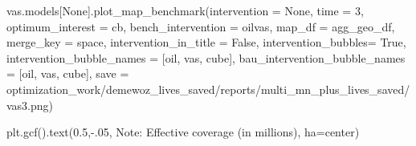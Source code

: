 \documentclass[
]{article}
\newenvironment{Shaded}{}{}
\newcommand{\DecValTok}[1]{\textcolor[rgb]{0.25,0.63,0.44}{#1}}
\newcommand{\FloatTok}[1]{\textcolor[rgb]{0.25,0.63,0.44}{#1}}
\newcommand{\NormalTok}[1]{#1}
\newcommand{\OperatorTok}[1]{\textcolor[rgb]{0.40,0.40,0.40}{#1}}
\newcommand{\StringTok}[1]{\textcolor[rgb]{0.25,0.44,0.63}{#1}}
\newcommand{\VariableTok}[1]{\textcolor[rgb]{0.10,0.09,0.49}{#1}}
\begin{document}
\begin{Shaded}
\begin{Highlighting}[numbers=left,,firstnumber=152,]
\NormalTok{vas.models[}\VariableTok{None}\NormalTok{].plot\_map\_benchmark(intervention }\OperatorTok{=} \VariableTok{None}\NormalTok{, }
\NormalTok{time }\OperatorTok{=} \DecValTok{3}\NormalTok{, }
\NormalTok{optimum\_interest }\OperatorTok{=} \StringTok{\textquotesingle{}cb\textquotesingle{}}\NormalTok{, }
\NormalTok{bench\_intervention }\OperatorTok{=} \StringTok{\textquotesingle{}oilvas\textquotesingle{}}\NormalTok{,}
\NormalTok{map\_df }\OperatorTok{=}\NormalTok{ agg\_geo\_df,}
\NormalTok{merge\_key }\OperatorTok{=} \StringTok{\textquotesingle{}space\textquotesingle{}}\NormalTok{,}
\NormalTok{intervention\_in\_title }\OperatorTok{=} \VariableTok{False}\NormalTok{,}
\NormalTok{intervention\_bubbles}\OperatorTok{=} \VariableTok{True}\NormalTok{,}
\NormalTok{intervention\_bubble\_names }\OperatorTok{=}\NormalTok{ [}\StringTok{\textquotesingle{}oil\textquotesingle{}}\NormalTok{, }\StringTok{\textquotesingle{}vas\textquotesingle{}}\NormalTok{, }\StringTok{\textquotesingle{}cube\textquotesingle{}}\NormalTok{],}
\NormalTok{bau\_intervention\_bubble\_names }\OperatorTok{=}\NormalTok{ [}\StringTok{\textquotesingle{}oil\textquotesingle{}}\NormalTok{, }\StringTok{\textquotesingle{}vas\textquotesingle{}}\NormalTok{, }\StringTok{\textquotesingle{}cube\textquotesingle{}}\NormalTok{],}
\NormalTok{save }\OperatorTok{=} \StringTok{\textquotesingle{}optimization\_work/demewoz\_lives\_saved/reports/multi\_mn\_plus\_lives\_saved/vas3.png\textquotesingle{}}\NormalTok{)}

\NormalTok{plt.gcf().text(}\FloatTok{0.5}\NormalTok{,}\OperatorTok{{-}}\FloatTok{.05}\NormalTok{, }\StringTok{\textquotesingle{}Note: Effective coverage (in millions)\textquotesingle{}}\NormalTok{, ha}\OperatorTok{=}\StringTok{\textquotesingle{}center\textquotesingle{}}\NormalTok{)}


\end{Highlighting}
\end{Shaded}
\end{document}
